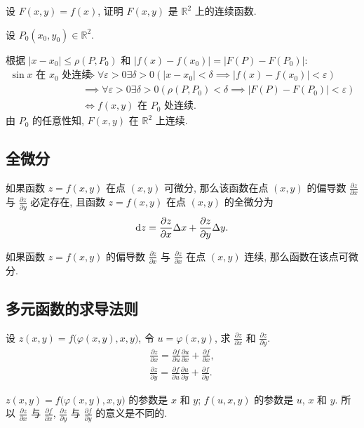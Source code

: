 \documentclass[a4paper,10pt,fleqn]{article}
\newcommand{\pdif}[2]{\frac{\partial #1}{\partial #2}}
\begin{document}
\begin{exmp}
    设 $F(x,y)=f(x)$, 证明 $F(x,y)$ 是 $\mathbb{R}^2$ 上的连续函数.

    设 $P_0(x_0,y_0)\in\mathbb{R}^2$.

    根据 $|x-x_0|\leq\rho(P,P_0)$ 和 $\big|f(x)-f(x_0)\big|=\big|F(P)-F(P_0)\big|$:
    \begin{align*}
        \text{$\sin x$ 在 $x_0$ 处连续} & \iff\forall\varepsilon>0\exists\delta>0\left(|x-x_0|<\delta\implies\big|f(x)-f(x_0)\big|<\varepsilon\right)         \\
                                        & \implies\forall\varepsilon>0\exists\delta>0\left(\rho(P,P_0)<\delta\implies\big|F(P)-F(P_0)\big|<\varepsilon\right) \\
                                        & \iff\text{$f(x,y)$ 在 $P_0$ 处连续.}
    \end{align*}
    由 $P_0$ 的任意性知, $F(x,y)$ 在 $\mathbb{R}^2$ 上连续.
\end{exmp}

\subsection{全微分}

\begin{thm}[必要条件]
    如果函数 $z=f(x,y)$ 在点 $(x,y)$ 可微分, 那么该函数在点 $(x,y)$ 的偏导数 $\pdif{z}{x}$
    与 $\pdif{z}{y}$ 必定存在, 且函数 $z=f(x,y)$ 在点 $(x,y)$ 的全微分为
    \[
        {\rm d}z=\pdif{z}{x}\Delta x+\pdif{z}{y}\Delta y.
    \]
\end{thm}

\begin{thm}[充分条件]
    如果函数 $z=f(x,y)$ 的偏导数 $\pdif{z}{x}$ 与 $\pdif{z}{x}$ 在点
    $(x,y)$ 连续, 那么函数在该点可微分.
\end{thm}

\subsection{多元函数的求导法则}

\begin{exmp}
    设 $z(x,y)=f\big(\varphi(x,y),x,y\big)$, 令 $u=\varphi(x,y)$, 求 $\pdif{z}{x}$ 和
    $\pdif{z}{y}$.
    \begin{align*}
        \pdif{z}{x}=\pdif{f}{u}\pdif{u}{x}+\pdif{f}{x}, \\
        \pdif{z}{y}=\pdif{f}{u}\pdif{u}{y}+\pdif{f}{y}.
    \end{align*}
    \begin{attn}
        $z(x,y)=f\big(\varphi(x,y),x,y\big)$ 的参数是 $x$ 和 $y$; $f(u,x,y)$ 的参数是 $u$, $x$ 和 $y$. 所以
        $\pdif{z}{x}$ 与 $\pdif{f}{x}$, $\pdif{z}{y}$ 与 $\pdif{f}{y}$ 的意义是不同的.
    \end{attn}
\end{exmp}
\end{document}
